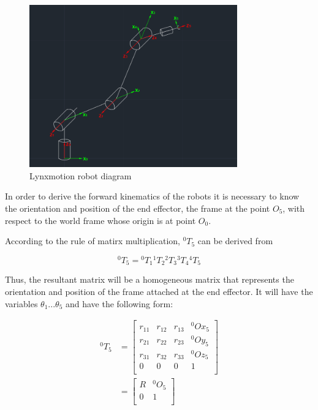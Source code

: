 \documentclass{article}
\newcommand{\T}[2]{{}^{#1}T_{#2}}
\begin{document}
\begin{figure}
\begin{center}
\includegraphics[width=0.8\textwidth]{images/diagram}
\caption{Lynxmotion robot diagram}
\label{fig:forward.diagram}
\end{center}
\end{figure}

In order to derive the forward kinematics of the robots it is necessary to know the orientation and position of the end effector, the frame at the point $O_5$, with respect to the world frame whose origin is at point $O_0$.

According to the rule of matirx multiplication, $\T{0}{5}$ can be derived from

\begin{equation}
\T{0}{5} = \T{0}{1} \T{1}{2}\T{2}{3}\T{3}{4}\T{4}{5}
\end{equation}

Thus, the resultant matrix will be a homogeneous matrix that represents the orientation and position of the frame attached at the end effector. It will have the variables $\theta_1 ... \theta_5$ and have the following form:

\begin{subequations}
\begin{align}
\T{0}{5} & = \left[
\begin{array}{cccc}
	r_{11} & r_{12} & r_{13} & {}^0Ox_5 \\
	r_{21} & r_{22} & r_{23} & {}^0Oy_5 \\
	r_{31} & r_{32} & r_{33} & {}^0Oz_5 \\
	0 & 0 & 0 & 1 \\
\end{array}
\right] \\
& = \left[
\begin{array}{cc}
	R & {}^0O_5 \\
	 0 & 1 \\
\end{array}
\right] 
\end{align}
\end{subequations}
\end{document}
